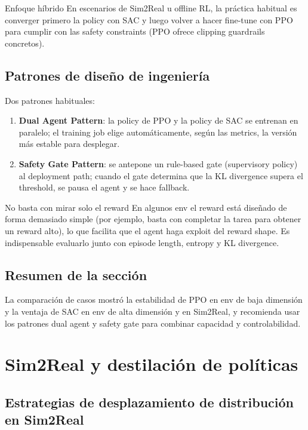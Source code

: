 \documentclass[a4paper]{article}
\begin{document}
\begin{importantbox}{Enfoque híbrido}
En escenarios de Sim2Real u offline RL, la práctica habitual es converger primero la policy con SAC y luego volver a hacer fine-tune con PPO para cumplir con las safety constraints (PPO ofrece clipping guardrails concretos).
\end{importantbox}

\subsection{Patrones de diseño de ingeniería}

Dos patrones habituales:

\begin{enumerate}
    \item \textbf{Dual Agent Pattern}: la policy de PPO y la policy de SAC se entrenan en paralelo; el training job elige automáticamente, según las metrics, la versión más estable para desplegar.
    \item \textbf{Safety Gate Pattern}: se antepone un rule-based gate (supervisory policy) al deployment path; cuando el gate determina que la KL divergence supera el threshold, se pausa el agent y se hace fallback.
\end{enumerate}

\begin{warningbox}{No basta con mirar solo el reward}
En algunos env el reward está diseñado de forma demasiado simple (por ejemplo, basta con completar la tarea para obtener un reward alto), lo que facilita que el agent haga exploit del reward shape. Es indispensable evaluarlo junto con episode length, entropy y KL divergence.
\end{warningbox}

\subsection{Resumen de la sección}

La comparación de casos mostró la estabilidad de PPO en env de baja dimensión y la ventaja de SAC en env de alta dimensión y en Sim2Real, y recomienda usar los patrones dual agent y safety gate para combinar capacidad y controlabilidad.

\section{Sim2Real y destilación de políticas}

\subsection{Estrategias de desplazamiento de distribución en Sim2Real}
\end{document}
